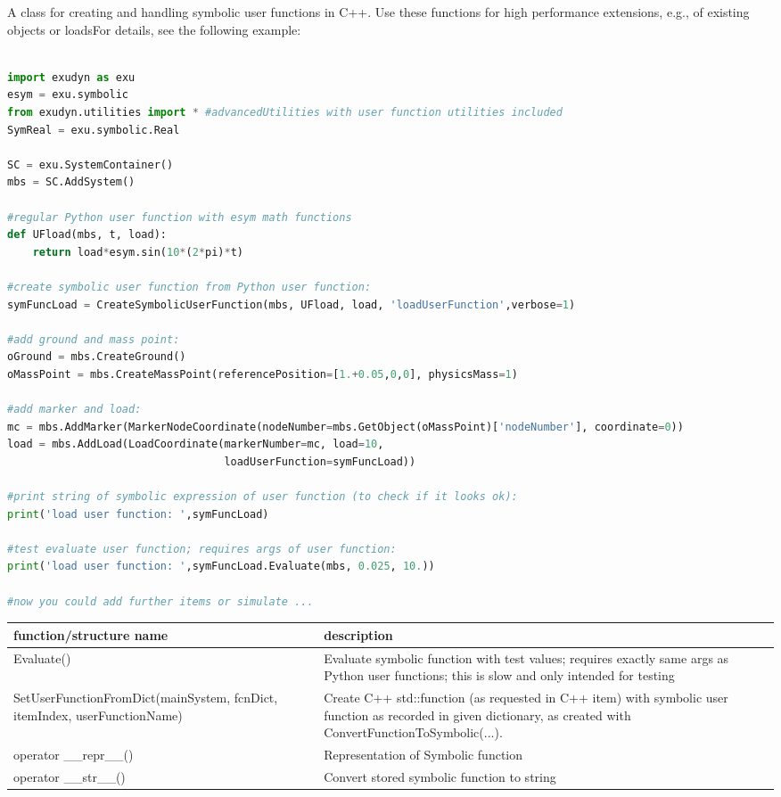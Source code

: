 A class for creating and handling symbolic user functions in C++. Use these functions for high performance extensions, e.g., of existing objects or loadsFor details, see the following example:
\pythonstyle
\begin{lstlisting}[language=Python, firstnumber=1]

import exudyn as exu
esym = exu.symbolic
from exudyn.utilities import * #advancedUtilities with user function utilities included
SymReal = exu.symbolic.Real

SC = exu.SystemContainer()
mbs = SC.AddSystem()

#regular Python user function with esym math functions
def UFload(mbs, t, load):
    return load*esym.sin(10*(2*pi)*t)

#create symbolic user function from Python user function:
symFuncLoad = CreateSymbolicUserFunction(mbs, UFload, load, 'loadUserFunction',verbose=1)

#add ground and mass point:
oGround = mbs.CreateGround()
oMassPoint = mbs.CreateMassPoint(referencePosition=[1.+0.05,0,0], physicsMass=1)

#add marker and load:
mc = mbs.AddMarker(MarkerNodeCoordinate(nodeNumber=mbs.GetObject(oMassPoint)['nodeNumber'], coordinate=0))
load = mbs.AddLoad(LoadCoordinate(markerNumber=mc, load=10,
                                  loadUserFunction=symFuncLoad))

#print string of symbolic expression of user function (to check if it looks ok):
print('load user function: ',symFuncLoad)

#test evaluate user function; requires args of user function:
print('load user function: ',symFuncLoad.Evaluate(mbs, 0.025, 10.))
    
#now you could add further items or simulate ...
\end{lstlisting}

\begin{center}
\footnotesize
\begin{longtable}{| p{8cm} | p{8cm} |} 
\hline
{\bf function/structure name} & {\bf description}\\ \hline
  Evaluate() & Evaluate symbolic function with test values; requires exactly same args as Python user functions; this is slow and only intended for testing\\ \hline 
  SetUserFunctionFromDict(mainSystem, fcnDict, itemIndex, userFunctionName) & Create C++ std::function (as requested in C++ item) with symbolic user function as recorded in given dictionary, as created with ConvertFunctionToSymbolic(...).\\ \hline 
  operator \_\_repr\_\_() & Representation of Symbolic function\\ \hline  
  operator \_\_str\_\_() & Convert stored symbolic function to string\\ \hline  
\end{longtable}
\end{center}

